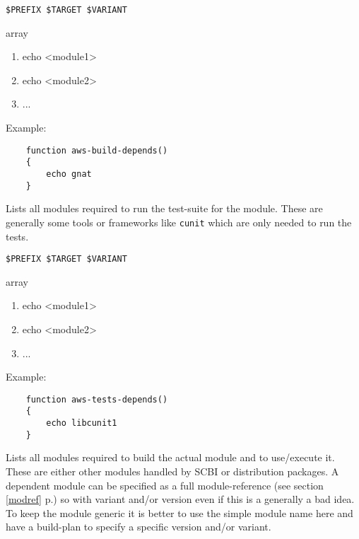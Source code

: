 \documentclass[a4paper,12pt,twoside]{article}
\newcommand{\code}[1]{\texttt{#1}}
\newcommand{\seeref}[1]{see section \ref{#1} p.\pageref{#1}}
\begin{document}
\begin{description}[font=\large\texttt]
	\begin{description}[font=\textit,style=standard]
		\item[parameter] \tabto{2cm} \code{\$PREFIX \$TARGET \$VARIANT}
		\item[return] \tabto{2cm} array
		\begin{enumerate}
			\item echo <module1>
			\item echo <module2>
			\item ...
		\end{enumerate}
	\end{description}

	Example:
	\begin{lstlisting}
	function aws-build-depends()
	{
		echo gnat
	}
	\end{lstlisting}

	\item[<module>{[}-common|<variant>{]}-tests-depends] Lists all modules required to run the test-suite for the module. These are generally some tools or frameworks like \code{cunit} which are only needed to run the tests.

	\begin{description}[font=\textit,style=standard]
		\item[parameter] \tabto{2cm} \code{\$PREFIX \$TARGET \$VARIANT}
		\item[return] \tabto{2cm} array
		\begin{enumerate}
			\item echo <module1>
			\item echo <module2>
			\item ...
		\end{enumerate}
	\end{description}

	Example:
	\begin{lstlisting}
	function aws-tests-depends()
	{
		echo libcunit1
	}
	\end{lstlisting}

	\item[<module>{[}-common|<variant>{]}-depends] Lists all modules required to build the actual module and to use/execute it. These are either other modules handled by SCBI or distribution packages. A dependent module can be specified as a full module-reference (\seeref{modref}) so with variant and/or version even if this is a generally a bad idea. To keep the module generic it is better to use the simple module name here and have a build-plan to specify a specific version and/or variant.


\end{description}
\end{document}

